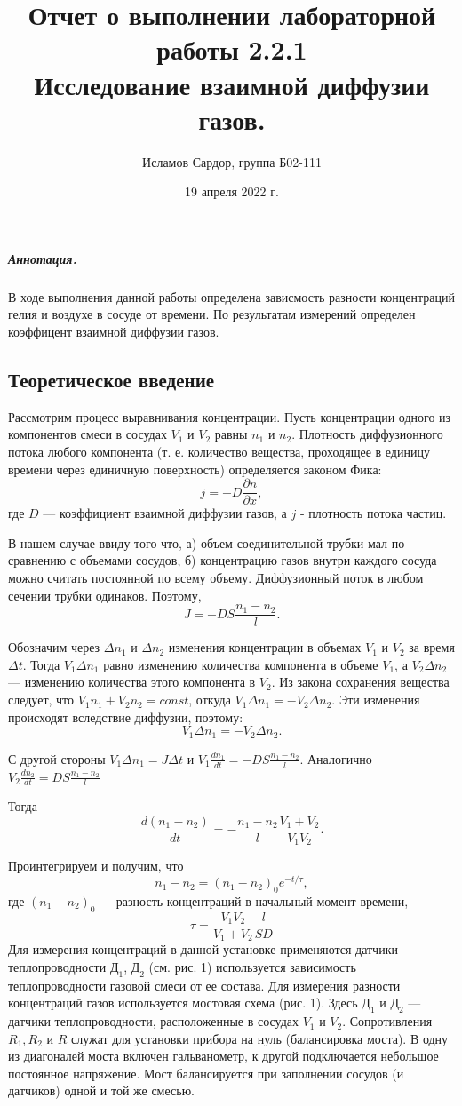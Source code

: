 \documentclass[12pt,a4paper]{article}
\title{
Отчет о выполнении лабораторной работы 2.2.1 \\
Исследование взаимной диффузии газов.}
\author{Исламов Сардор, группа Б02-111}
\date{19 апреля 2022 г.}
\begin{document}
	
\maketitle

\subparagraph*{Аннотация.}
В ходе выполнения данной работы определена зависмость разности концентраций гелия и воздухе в сосуде от времени. 
По результатам измерений определен коэффицент взаимной диффузии газов.
\subsection*{Теоретическое введение}
Рассмотрим процесс выравнивания концентрации. Пусть концентрации одного из компонентов смеси в сосудах $V_1$ и $V_2$ равны $n_1$ и
$n_2$. Плотность диффузионного потока любого компонента (т. е. количество вещества, проходящее в единицу времени через единичную поверхность) определяется законом Фика:
$$j=-D\frac{\partial n}{\partial x},$$ где $D$ — коэффициент взаимной диффузии газов, а $j$ - плотность потока частиц.

В нашем случае ввиду того что, а) объем соединительной трубки мал по сравнению с объемами сосудов, б) концентрацию газов внутри каждого сосуда можно считать постоянной по всему объему. Диффузионный поток в любом сечении трубки одинаков. Поэтому, $$J=-DS\frac{n_1-n_2}{l}.$$

Обозначим через $\Delta n_1$ и $\Delta n_2$ изменения концентрации в объемах
$V_1$ и $V_2$ за время $\Delta t$. Тогда $V_1 \Delta n_1$ равно изменению количества компонента в объеме $V_1$, а $V_2 \Delta n_2$ — изменению количества этого компонента в $V_2$. Из закона сохранения вещества следует, что $V_1n_1+V_2n_2 = const$, откуда $V_1 \Delta n_1 = -V_2\Delta n_2.$ Эти изменения происходят вследствие диффузии, поэтому: $$V_1\Delta n_1=-V_2\Delta n_2.$$

С другой стороны $V_1\Delta n_1=J\Delta t$ и $V_1\frac{dn_1}{dt}=-DS\frac{n_1-n_2}{l}.$ Аналогично $V_2\frac{dn_2}{dt}=DS\frac{n_1-n_2}{l}$

Тогда $$\frac{d(n_1-n_2)}{dt}=-\frac{n_1-n_2}{l} \frac{V_1+V_2}{V_1V_2}.$$

Проинтегрируем и получим, что $$n_1-n_2=(n_1-n_2)_0 e^{-t/\tau},$$ где $(n_1-
n_2)_0$ — разность концентраций в начальный момент времени, 
\begin{equation}
	\tau=\frac{V_1V_2}{V_1+V_2}\frac{l}{SD}
\end{equation}
Для измерения концентраций в данной установке применяются датчики теплопроводности $Д_1$, $Д_2$ (см. рис. 1) используется зависимость теплопроводности газовой смеси от ее состава.
Для измерения разности концентраций газов используется мостовая схема (рис. 1). Здесь $Д_1$ и $Д_2$ — датчики теплопроводности, расположенные в сосудах $V_1$ и $V_2$. Сопротивления $R_1, R_2$ и $R$ служат для установки прибора на нуль (балансировка моста). В одну из диагоналей моста включен гальванометр, к другой подключается небольшое постоянное напряжение. Мост балансируется при заполнении сосудов (и датчиков) одной и той же смесью.
\end{document}

